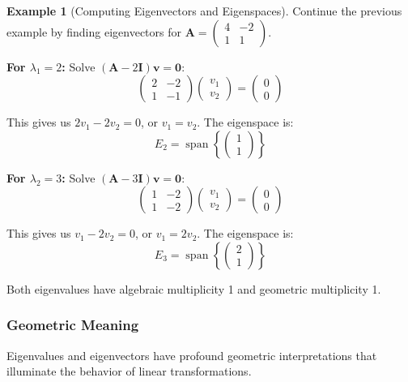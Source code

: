 \documentclass[12pt]{article}
\numberwithin{equation}{section}
\newcommand{\vect}[1]{\boldsymbol{#1}}   %
\newcommand{\mat}[1]{\mathbf{#1}}        %
\newcommand{\Span}{\operatorname{span}}
\theoremstyle{plain}
\theoremstyle{definition}
\newtheorem{example}[theorem]{Example}
\theoremstyle{remark}
\begin{document}
\begin{example}[Computing Eigenvectors and Eigenspaces]
Continue the previous example by finding eigenvectors for $\mat{A} = \begin{pmatrix} 4 & -2 \\ 1 & 1 \end{pmatrix}$.

\textbf{For $\lambda_1 = 2$:} Solve $(\mat{A} - 2\mat{I})\vect{v} = \vect{0}$:
$$\begin{pmatrix} 2 & -2 \\ 1 & -1 \end{pmatrix}\begin{pmatrix} v_1 \\ v_2 \end{pmatrix} = \begin{pmatrix} 0 \\ 0 \end{pmatrix}$$

This gives us $2v_1 - 2v_2 = 0$, or $v_1 = v_2$. The eigenspace is:
$$E_2 = \Span\left\{\begin{pmatrix} 1 \\ 1 \end{pmatrix}\right\}$$

\textbf{For $\lambda_2 = 3$:} Solve $(\mat{A} - 3\mat{I})\vect{v} = \vect{0}$:
$$\begin{pmatrix} 1 & -2 \\ 1 & -2 \end{pmatrix}\begin{pmatrix} v_1 \\ v_2 \end{pmatrix} = \begin{pmatrix} 0 \\ 0 \end{pmatrix}$$

This gives us $v_1 - 2v_2 = 0$, or $v_1 = 2v_2$. The eigenspace is:
$$E_3 = \Span\left\{\begin{pmatrix} 2 \\ 1 \end{pmatrix}\right\}$$

Both eigenvalues have algebraic multiplicity 1 and geometric multiplicity 1.
\end{example}

\subsubsection{Geometric Meaning}

Eigenvalues and eigenvectors have profound geometric interpretations that illuminate the behavior of linear transformations.
\end{document}
